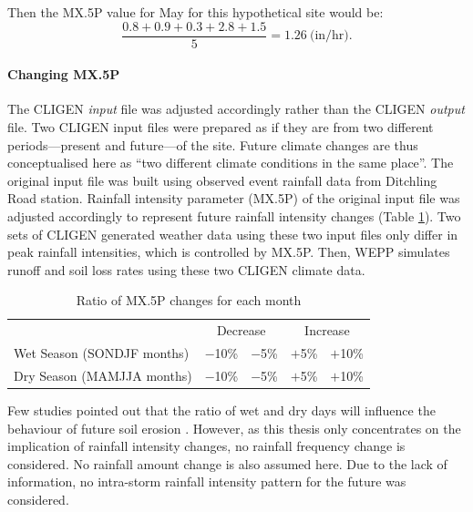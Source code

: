 Then the {MX.5P} value for May for this hypothetical site would be:
\begin{equation}
  \frac{0.8+0.9+0.3+2.8+1.5}{5} = 1.26 \ \textrm{(in/hr)}.
\end{equation}

\paragraph{Changing {MX.5P}} The CLIGEN \emph{input} file was adjusted
accordingly rather than the CLIGEN
\textit{output} file. Two CLIGEN input files were prepared as if they are from
two different periods---present and future---of the site. Future climate changes
are thus conceptualised here as ``two different climate conditions in the same
place''. The original input file was built using observed event rainfall data
from Ditchling Road station. Rainfall intensity parameter ({MX.5P}) of the
original input file was adjusted accordingly to represent future rainfall
intensity changes (Table \ref{tab:MX5PChanges}). Two sets of CLIGEN generated
weather data using these two input files only differ in peak rainfall
intensities, which is controlled by {MX.5P}. Then, WEPP simulates runoff and
soil
loss rates using these two CLIGEN climate data.

\begin{table}[htpb]
  \centering
  \caption{Ratio of {MX.5P} changes for each month}
  \label{tab:MX5PChanges}
    \begin{tabular}{lcccc}
    \toprule
    & \multicolumn{2}{c}{Decrease} & \multicolumn{2}{c}{Increase} \\
    \cmidrule(r){2-3} \cmidrule(l){4-5}
    Wet Season (SONDJF months)   & $-$10\% &  $-$5\%  & $+$5\%  & $+$10\% \\
    Dry Season (MAMJJA months)   & $-$10\%  & $-$5\%  & $+$5\%  & $+$10\% \\
    \bottomrule
    \end{tabular}
\end{table}

Few studies pointed out that the ratio of wet and dry days will influence the
behaviour of future soil erosion
\citep{nearing2001-229,pruski2002-climate,pruski2002-7}. However, as this thesis
only concentrates on the implication of rainfall intensity changes, no rainfall
frequency change is considered. No rainfall amount change is also assumed here.
Due to the lack of information, no intra-storm rainfall intensity pattern for
the future was considered.


